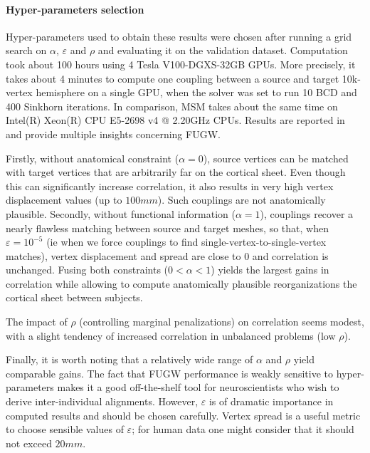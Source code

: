 \paragraph{Hyper-parameters selection}
\label{par:params_selection}

Hyper-parameters used to obtain these results were chosen
after running a grid search on $\alpha$, $\varepsilon$ and $\rho$
and evaluating it on the validation dataset.
Computation took about 100 hours using 4 Tesla V100-DGXS-32GB GPUs. More precisely,
it takes about 4 minutes to compute one coupling between a source and target 10k-vertex
hemisphere on a single GPU, when the solver was set to run 10 BCD and 400 Sinkhorn iterations.
In comparison, MSM takes about the same time on Intel(R) Xeon(R) CPU E5-2698 v4 @ 2.20GHz CPUs.
Results are reported in  and provide multiple insights concerning FUGW.

Firstly, without anatomical constraint ($\alpha = 0$),
source vertices can be matched with target vertices
that are arbitrarily far on the cortical sheet.
Even though this can significantly increase correlation, it also
results in very high vertex displacement values (up to $100mm$).
Such couplings are not anatomically plausible.
%
Secondly, without functional information ($\alpha = 1$),
couplings recover a nearly flawless matching between source and target meshes,
so that, when $\varepsilon = 10^{-5}$
(ie when we force couplings to find single-vertex-to-single-vertex matches),
vertex displacement and spread are close to 0 and correlation is unchanged.
%
Fusing both constraints ($0 < \alpha < 1$)
yields the largest gains in correlation while allowing to compute
anatomically plausible reorganizations the cortical sheet between subjects.

The impact of $\rho$ (controlling marginal penalizations) on correlation seems modest,
with a slight tendency of increased correlation in unbalanced problems (low $\rho$).

Finally, it is worth noting that a relatively wide range of $\alpha$ and $\rho$ yield comparable gains.
The fact that FUGW performance is weakly sensitive to hyper-parameters makes it
a good off-the-shelf tool for neuroscientists who wish to derive inter-individual alignments.
However, $\varepsilon$ is of dramatic importance in computed results and should be chosen carefully.
Vertex spread is a useful metric to choose sensible values of $\varepsilon$;
for human data one might consider that it should not exceed $20mm$.

